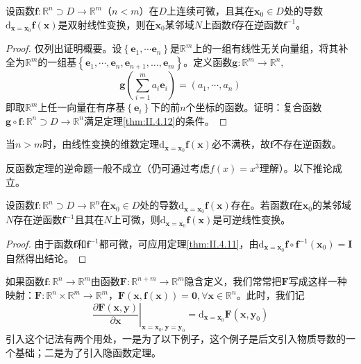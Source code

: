 \documentclass[main.tex]{subfiles}
\begin{document}
\begin{corollary}
    设函数$\mathbf{f}:\mathbb{R}^n\supset D\rightarrow\mathbb{R}^m$（$n<m$）在$D$上连续可微，且其在$\mathbf{x}_0\in D$处的导数$\mathrm{d}_{\mathbf{x}=\mathbf{x}_0}\mathbf{f}\left(\mathbf{x}\right)$是双射线性变换，则在$\mathbf{x}_0$某邻域$N$上函数$\mathbf{f}$存在逆函数$\mathbf{f}^{-1}$。
\end{corollary}
\begin{proof}
    仅列出证明概要。设$\left\{\mathbf{e}_1,\cdots\mathbf{e}_n\right\}$是$\mathbb{R}^m$上的一组有线性无关向量组，将其补全为$\mathbb{R}^m$的一组基$\left\{\mathbf{e}_1,\cdots,\mathbf{e}_n,\mathbf{e}_{n+1},\dots,\mathbf{e}_m\right\}$。定义函数$\mathbf{g}:\mathbb{R}^m\rightarrow\mathbb{R}^n,$
    \[\mathbf{g}\left(\sum_{i=1}^m a_i\mathbf{e}_i\right)=\left(a_1,\cdots,a_n\right)\]
    即取$\mathbb{R}^m$上任一向量在有序基$\left\{\mathbf{e}_i\right\}$下的前$n$个坐标的函数。证明：复合函数$\mathbf{g}\circ\mathbf{f}:\mathbb{R}^n\supset D\rightarrow\mathbb{R}^n$满足定理\ref{thm:II.4.12}的条件。

\end{proof}

当$n>m$时，由线性变换的维数定理$\mathrm{d}_{\mathbf{x}=\mathbf{x}_0}\mathbf{f}\left(\mathbf{x}\right)$必不满秩，故$\mathbf{f}$不存在逆函数。

反函数定理的逆命题一般不成立（仍可通过考虑$f\left(x\right)=x^3$理解）。以下推论成立。

\begin{corollary}
    设函数$\mathbf{f}:\mathbb{R}^n\supset D\rightarrow\mathbb{R}^n$在$\mathbf{x}_0\in D$处的导数$\mathrm{d}_{\mathbf{x}=\mathbf{x}_0}\mathbf{f}\left(\mathbf{x}\right)$存在。若函数$\mathbf{f}$在$\mathbf{x}_0$的某邻域$N$存在逆函数$\mathbf{f}^{-1}$且其在$N$上可微，则$\mathrm{d}_{\mathbf{x}=\mathbf{x}_0}\mathbf{f}\left(\mathbf{x}\right)$是可逆线性变换。
\end{corollary}
\begin{proof}
    由于函数$\mathbf{f}$和$\mathbf{f}^{-1}$都可微，可应用定理\ref{thm:II.4.11}，由$\mathrm{d}_{\mathbf{x}=\mathbf{x}_0}\mathbf{f}\circ\mathbf{f}^{-1}\left(\mathbf{x}_0\right)=\mathbf{I}$自然得出结论。
\end{proof}

如果函数$\mathbf{f}:\mathbb{R}^n\rightarrow\mathbb{R}^m$由函数$\mathbf{F}:\mathbb{R}^{n+m}\rightarrow\mathbb{R}^m$隐含定义，我们常常把$\mathbf{F}$写成这样一种映射：$\mathbf{F}:\mathbb{R}^n\times\mathbb{R}^m\rightarrow\mathbb{R}^m$，$\mathbf{F}\left(\mathbf{x},\mathbf{f}\left(\mathbf{x}\right)\right)=\mathbf{0},\forall\mathbf{x}\in\mathbb{R}^n$。此时，我们记
\[\left.\frac{\partial \mathbf{F}\left(\mathbf{x},\mathbf{y}\right)}{\partial \mathbf{x}}\right|_{\mathbf{x}=\mathbf{x}_0,\mathbf{y}=\mathbf{y}_0}=
    \mathrm{d}_{\mathbf{x}=\mathbf{x}_0}\mathbf{F}\left(\mathbf{x},\mathbf{y}_0\right)\]
引入这个记法有两个用处，一是为了以下例子，这个例子是后文引入物质导数的一个基础；二是为了引入隐函数定理。
\end{document}

